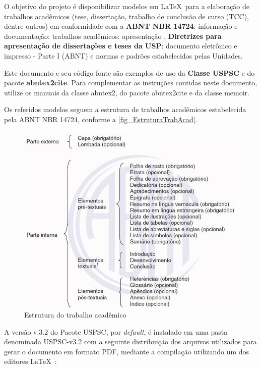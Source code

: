 O objetivo do projeto é disponibilizar modelos em \LaTeX\  para a elaboração de trabalhos acadêmicos (tese, dissertação, trabalho de conclusão de curso (TCC), dentre outros) em conformidade com a \textbf{ABNT NBR 14724}: informação e documentação: trabalhos acadêmicos: apresentação \cite{nbr14724}, \textbf{Diretrizes para apresentação de dissertações e teses da USP}: documento eletrônico e impresso - Parte I (ABNT) \cite{aguia2020} e normas e padrões estabelecidos pelas Unidades.

Este documento e seu código fonte são exemplos de uso da \textbf{Classe USPSC} e do pacote \textbf{abntex2cite}.
Para complementar as instruções contidas neste documento, utilize os manuais da \textsf{classe abntex2}\cite{abnetxclasse}, do pacote \textsf{abntex2cite}\cite{abnetxcite,abnetxcitealf} e da classe \textsf{memoir}\cite{memoir2010}. 


Os referidos modelos seguem a estrutura de trabalhos acadêmicos estabelecida pela ABNT NBR 14724, conforme a \autoref{fig_EstruturaTrabAcad}. 

\begin{figure}[htb]
	\caption{\label{fig_EstruturaTrabAcad}Estrutura do trabalho acadêmico}
	\begin{center}
		\includegraphics[scale=0.5]{USPSC-img/USPSC-EstruturaTrabAcad.jpg}
	\end{center}
\end{figure}

A versão v.3.2 do Pacote USPSC, por \textit{default}, é instalado em uma pasta denominada USPSC-v3.2 com a seguinte distribuição dos arquivos utilizados para gerar o documento em formato PDF, mediante a compilação utilizando um dos editores \LaTeX\ :


